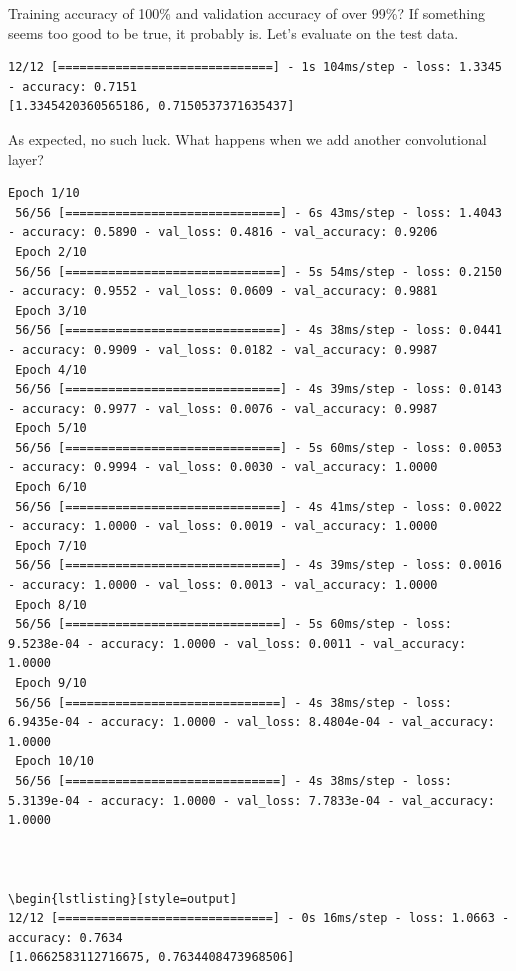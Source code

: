 \documentclass{article}
\begin{document}
Training accuracy of 100\% and validation accuracy of over 99\%? If something seems too good to be true, it probably is. Let's evaluate on the test data.



\begin{lstlisting}[style=output]
12/12 [==============================] - 1s 104ms/step - loss: 1.3345 - accuracy: 0.7151
[1.3345420360565186, 0.7150537371635437] 
\end{lstlisting}

As expected, no such luck. What happens when we add another convolutional layer?



\begin{lstlisting}[style=output]
 Epoch 1/10
 56/56 [==============================] - 6s 43ms/step - loss: 1.4043 - accuracy: 0.5890 - val_loss: 0.4816 - val_accuracy: 0.9206
 Epoch 2/10
 56/56 [==============================] - 5s 54ms/step - loss: 0.2150 - accuracy: 0.9552 - val_loss: 0.0609 - val_accuracy: 0.9881
 Epoch 3/10
 56/56 [==============================] - 4s 38ms/step - loss: 0.0441 - accuracy: 0.9909 - val_loss: 0.0182 - val_accuracy: 0.9987
 Epoch 4/10
 56/56 [==============================] - 4s 39ms/step - loss: 0.0143 - accuracy: 0.9977 - val_loss: 0.0076 - val_accuracy: 0.9987
 Epoch 5/10
 56/56 [==============================] - 5s 60ms/step - loss: 0.0053 - accuracy: 0.9994 - val_loss: 0.0030 - val_accuracy: 1.0000
 Epoch 6/10
 56/56 [==============================] - 4s 41ms/step - loss: 0.0022 - accuracy: 1.0000 - val_loss: 0.0019 - val_accuracy: 1.0000
 Epoch 7/10
 56/56 [==============================] - 4s 39ms/step - loss: 0.0016 - accuracy: 1.0000 - val_loss: 0.0013 - val_accuracy: 1.0000
 Epoch 8/10
 56/56 [==============================] - 5s 60ms/step - loss: 9.5238e-04 - accuracy: 1.0000 - val_loss: 0.0011 - val_accuracy: 1.0000
 Epoch 9/10
 56/56 [==============================] - 4s 38ms/step - loss: 6.9435e-04 - accuracy: 1.0000 - val_loss: 8.4804e-04 - val_accuracy: 1.0000
 Epoch 10/10
 56/56 [==============================] - 4s 38ms/step - loss: 5.3139e-04 - accuracy: 1.0000 - val_loss: 7.7833e-04 - val_accuracy: 1.0000



\begin{lstlisting}[style=output]
12/12 [==============================] - 0s 16ms/step - loss: 1.0663 - accuracy: 0.7634
[1.0662583112716675, 0.7634408473968506]
\end{lstlisting}
\end{document}
